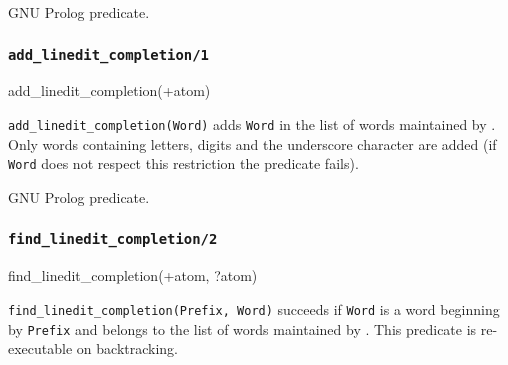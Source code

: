 \Portability

GNU Prolog predicate.

\subsubsection{\texttt{add\_linedit\_completion/1}}

\begin{TemplatesOneCol}
add\_linedit\_completion(+atom)

\end{TemplatesOneCol}

\Description

\texttt{add\_linedit\_completion(Word)} adds \texttt{Word} in the list of
 words maintained by 
. Only words containing letters, digits and
the underscore character are added (if \texttt{Word} does not respect
this restriction the predicate fails).

\begin{PlErrors}



\end{PlErrors}

\Portability

GNU Prolog predicate.

\subsubsection{\texttt{find\_linedit\_completion/2}}

\begin{TemplatesOneCol}
find\_linedit\_completion(+atom, ?atom)

\end{TemplatesOneCol}

\Description

\texttt{find\_linedit\_completion(Prefix, Word)} succeeds if \texttt{Word}
is a word beginning by \texttt{Prefix} and belongs to the list of
 words maintained by 
. This predicate is re-executable on backtracking.

\begin{PlErrors}




\end{PlErrors}

